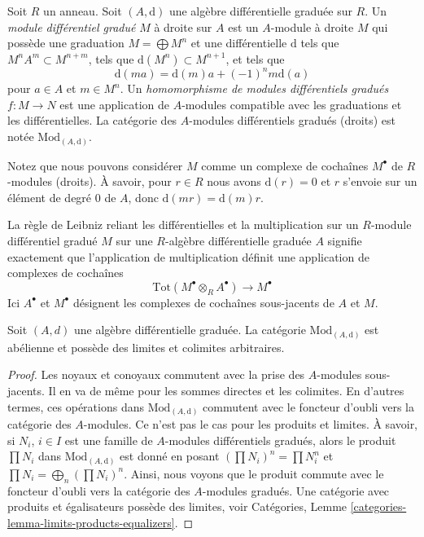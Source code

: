 \begin{definition}
\label{definition-dgm}
Soit $R$ un anneau. Soit $(A, \text{d})$ une algèbre différentielle graduée sur
$R$. Un {\it module différentiel gradué} $M$ à droite sur $A$ est un $A$-module à
droite $M$ qui possède une graduation $M = \bigoplus M^n$ et une différentielle
$\text{d}$ tels que $M^n A^m \subset M^{n + m}$, tels que $\text{d}(M^n) \subset
M^{n + 1}$, et tels que
$$
\text{d}(ma) = \text{d}(m)a + (-1)^n m\text{d}(a)
$$
pour $a \in A$ et $m \in M^n$. Un {\it homomorphisme de modules différentiels
gradués} $f : M \to N$ est une application de $A$-modules compatible avec les
graduations et les différentielles. La catégorie des $A$-modules différentiels
gradués (droits) est notée $\text{Mod}_{(A, \text{d})}$.
\end{definition}

\noindent
Notez que nous pouvons considérer $M$ comme un complexe de cochaînes $M^\bullet$
de $R$-modules (droits). À savoir, pour $r \in R$ nous avons $\text{d}(r) = 0$ et
$r$ s'envoie sur un élément de degré $0$ de $A$, donc $\text{d}(mr) =
\text{d}(m)r$.

\medskip\noindent
La règle de Leibniz reliant les différentielles et la multiplication sur un
$R$-module différentiel gradué $M$ sur une $R$-algèbre différentielle graduée $A$
signifie exactement que l'application de multiplication définit une application de
complexes de cochaînes
$$
\text{Tot}(M^\bullet \otimes_R A^\bullet) \to M^\bullet
$$
Ici $A^\bullet$ et $M^\bullet$ désignent les complexes de cochaînes sous-jacents
de $A$ et $M$.

\begin{lemma}
\label{lemma-dgm-abelian}
Soit $(A, d)$ une algèbre différentielle graduée. La catégorie $\text{Mod}_{(A,
\text{d})}$ est abélienne et possède des limites et colimites arbitraires.
\end{lemma}

\begin{proof}
Les noyaux et conoyaux commutent avec la prise des $A$-modules sous-jacents. Il en
va de même pour les sommes directes et les colimites. En d'autres termes, ces
opérations dans $\text{Mod}_{(A, \text{d})}$ commutent avec le foncteur d'oubli
vers la catégorie des $A$-modules. Ce n'est pas le cas pour les produits et
limites. À savoir, si $N_i$, $i \in I$ est une famille de $A$-modules
différentiels gradués, alors le produit $\prod N_i$ dans $\text{Mod}_{(A,
\text{d})}$ est donné en posant $(\prod N_i)^n = \prod N_i^n$ et $\prod N_i =
\bigoplus_n (\prod N_i)^n$. Ainsi, nous voyons que le produit commute avec le
foncteur d'oubli vers la catégorie des $A$-modules gradués. Une catégorie avec
produits et égalisateurs possède des limites, voir
Catégories, Lemme \ref{categories-lemma-limits-products-equalizers}.
\end{proof}

